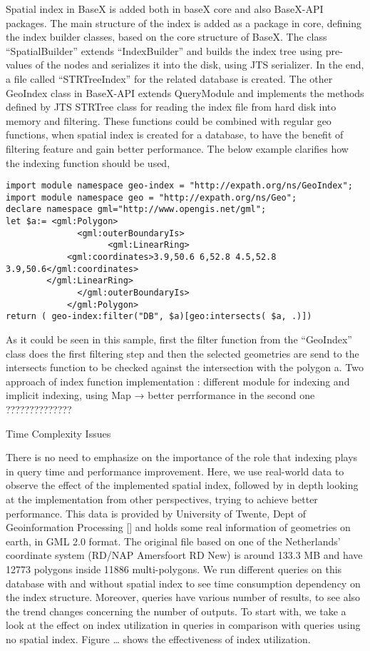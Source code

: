Spatial index in BaseX is added both in baseX core and also BaseX-API packages. The main structure of the index is added as a package in core, defining the index builder classes, based on the core structure of BaseX. The class “SpatialBuilder” extends “IndexBuilder” and builds the index tree using pre-values of the nodes and serializes it into the disk, using JTS serializer. In the end, a file called “STRTreeIndex” for the related database is created. 
The other GeoIndex class in BaseX-API extends QueryModule and implements the methods defined by JTS STRTree class for reading the index file from hard disk into memory and filtering. These functions could be combined with regular geo functions, when spatial index is created for a database, to have the benefit of filtering feature and gain better performance. The below example clarifies how the indexing function should be used,
\begin{verbatim}
import module namespace geo-index = "http://expath.org/ns/GeoIndex";
import module namespace geo = "http://expath.org/ns/Geo";
declare namespace gml="http://www.opengis.net/gml";
let $a:= <gml:Polygon>
              <gml:outerBoundaryIs>
                	<gml:LinearRing> 
			<gml:coordinates>3.9,50.6 6,52.8 4.5,52.8 3.9,50.6</gml:coordinates> 
		</gml:LinearRing>
              </gml:outerBoundaryIs>
            </gml:Polygon>
return ( geo-index:filter("DB", $a)[geo:intersects( $a, .)])
\end{verbatim}
As it could be seen in this sample, first the filter function from the “GeoIndex” class does the first  filtering step and then the selected geometries are send to the intersects function to be checked against the intersection with the polygon a.  
Two approach of index function implementation : different module for indexing and implicit indexing, using Map → better perrformance in the second one  ??????????????

Time Complexity Issues

There is no need to emphasize on the importance of the role that indexing plays in query time and performance improvement. Here, we use real-world data to observe the effect of the implemented spatial index, followed by in depth looking at the implementation from other perspectives, trying to achieve better performance. This data is provided by University of Twente, Dept of Geoinformation Processing [] and holds some real information of geometries on earth, in GML 2.0 format. The original file based on one of the Netherlands' coordinate system (RD/NAP Amersfoort RD New) is around 133.3 MB and have 12773 polygons inside 11886 multi-polygons.
We run different queries on this database with and without spatial index to see time consumption dependency on the index structure. Moreover, queries have various number of results, to see also the trend changes concerning the number of outputs.
To start with, we take a look at the effect on index utilization in queries in comparison with queries using no spatial index. Figure … shows the effectiveness of index utilization.

